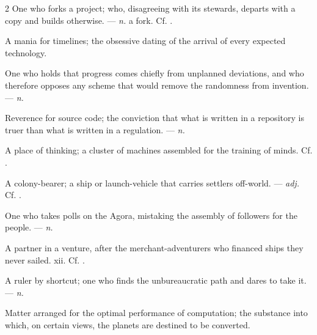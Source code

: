 \begin{multicols}{2}
 One who forks a project; who, disagreeing with its stewards, departs with a copy and builds otherwise.  —  \textit{n.} a fork. Cf. .

 A mania for timelines; the obsessive dating of the arrival of every expected technology.

 One who holds that progress comes chiefly from unplanned deviations, and who therefore opposes any scheme that would remove the randomness from invention. —  \textit{n.}

 Reverence for source code; the conviction that what is written in a repository is truer than what is written in a regulation. —  \textit{n.}

 A place of thinking; a cluster of machines assembled for the training of minds.   Cf. .

 A colony-bearer; a ship or launch-vehicle that carries settlers off-world. —  \textit{adj.} Cf. .

 One who takes polls on the Agora, mistaking the assembly of followers for the people. —  \textit{n.}

 A partner in a venture, after the merchant-adventurers who financed ships they never sailed.   xii. Cf. .

 A ruler by shortcut; one who finds the unbureaucratic path and dares to take it. —  \textit{n.}

 Matter arranged for the optimal performance of computation; the substance into which, on certain views, the planets are destined to be converted.


\end{multicols}
